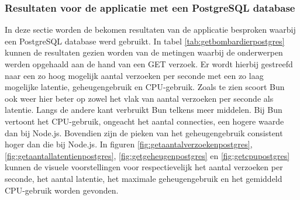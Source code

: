 \subsubsection{Resultaten voor de applicatie met een PostgreSQL database}
In deze sectie worden de bekomen resultaten van de applicatie besproken waarbij een PostgreSQL database werd gebruikt.
In tabel \ref{tab:getbombardierpostgres} kunnen de resultaten gezien worden van de metingen waarbij de onderwerpen werden opgehaald aan de hand van een GET verzoek.
Er wordt hierbij gestreefd naar een zo hoog mogelijk aantal verzoeken per seconde met een zo laag mogelijke latentie, geheugengebruik en CPU-gebruik.
Zoals te zien scoort Bun ook weer hier beter op zowel het vlak van aantal verzoeken per seconde als latentie.
Langs de andere kant verbruikt Bun telkens meer middelen. Bij Bun vertoont het CPU-gebruik, ongeacht het aantal connecties, een hogere waarde dan bij Node.js.
Bovendien zijn de pieken van het geheugengebruik consistent hoger dan die bij Node.js.
In figuren \ref{fig:getaantalverzoekenpostgres}, \ref{fig:getaantallatentienpostgres}, \ref{fig:getgeheugenpostgres} en \ref{fig:getcpupostgres} kunnen de visuele voorstellingen 
voor respectievelijk het aantal verzoeken per seconde, het aantal latentie, het maximale geheugengebruik en het gemiddeld CPU-gebruik worden gevonden.
